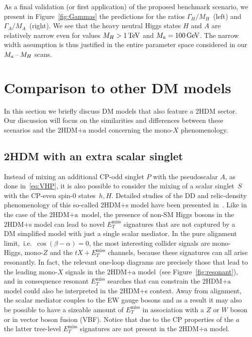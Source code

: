 \documentclass[a4paper, 11pt,notoc]{article}
\newcommand{\MET}{\ensuremath{E_T^\mathrm{miss}}\xspace}
\newcommand{\hdma}{\ensuremath{\textrm{2HDM+a}}\xspace}
\begin{document}
As a final validation (or first application) of the proposed benchmark scenario, we present in  Figure~\ref{fig:Gammas} the predictions for the ratios $\Gamma_H/M_H$~(left) and $\Gamma_A/M_A$~(right). We see that the heavy neutral Higgs states $H$ and $A$ are relatively narrow even for values $M_H > 1 \, {\rm TeV}$ and $M_a = 100 \, {\rm GeV}$.  The narrow width assumption is thus justified in the entire parameter space considered in our $M_a\hspace{0.5mm}$--$\hspace{0.5mm}M_H$ scans. 


\section{Comparison to other DM models}
\label{sec:comparison}

In this section we briefly discuss DM models that also feature a 2HDM sector.  Our discussion will focus on the similarities and differences  between these scenarios and the \hdma model  concerning the mono-$X$ phenomenology. 

\subsection*{2HDM with an extra scalar singlet}

Instead of mixing an additional CP-odd singlet $P$ with the pseudoscalar $A$, as done in~\eqref{eq:VHP}, it is also possible to consider the mixing of a  scalar singlet~$S$ with  the CP-even spin-0 states~$h,H$. Detailed studies of the DD and relic-density phenomenology of this so-called 2HDM+s model have been presented in~\cite{Bell:2016ekl,Bell:2017rgi}.  Like in the case of the \hdma~model, the presence of  non-SM Higgs bosons in the 2HDM+s model can lead to novel $\MET$ signatures that are not captured by a DM simplified model with just a single scalar mediator. In the pure alignment limit,~i.e.~$\cos ( \beta - \alpha) = 0$, the most interesting collider signals are mono-Higgs, mono-$Z$ and the $t X + \MET$  channels, because  these signatures can all arise resonantly.  In fact, the relevant one-loop diagrams are precisely those that  lead to the leading mono-$X$ signals in the \hdma model~(see Figure~\ref{fig:resonant}), and in consequence resonant $\MET$ searches that can constrain the \hdma model could also be interpreted in the 2HDM+s context. Away from alignment, the scalar mediator couples to the EW gauge bosons and as a result it may also be possible to have a sizeable amount of $\MET$ in association with a $Z$ or $W$ boson or in  vector boson fusion (VBF). Notice that due to the CP properties of the $a$ the latter tree-level $\MET$ signatures are not present in the \hdma model. 
\end{document}
